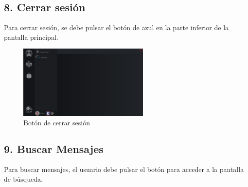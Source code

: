 \subsection*{8. Cerrar sesión}

Para cerrar sesión, se debe pulsar el botón de azul en la parte inferior de la pantalla principal.
\begin{figure}[H]
    \centering
    \includegraphics[width=0.58\textwidth]{images/manualDeUsuario/Logout1.png}
    \caption*{Botón de cerrar sesión}
\end{figure}

\subsection*{9. Buscar Mensajes}
Para buscar mensajes, el usuario debe pulsar el botón para acceder a la pantalla de búsqueda.


